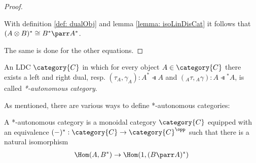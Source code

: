 \documentclass[DIN, pagenumber=false, fontsize=11pt, parskip=half, colorinlistoftodos, svgnames]{scrartcl}
\begin{document}
\begin{proof}
		\begin{center}
		\end{center}
		
		With definition \ref{def: dualObj} and lemma \ref{lemma: isoLinDisCat} it follows that $(A \otimes B)^* \cong B^* \parr A^* $.
		
		The same is done for the other equations.
	\end{proof}
	
	
	
	\begin{definition}
		\label{def: autoCatSrinivasan}
		An LDC $\category{C} $ in which for every object $A \in \category{C} $ there exists a left and right dual, resp. $(\tau_A, \gamma_A): A^* \dashV A $ and $({_A}\tau, {_A}\gamma): A \dashV {^*A} $, is called \emph{*-autonomous category}.
	\end{definition}
	
	As mentioned, there are various ways to define *-autonomous categories:
	
	\begin{definition}
		\label{def: autoCatBarrC}
		A *-autonomous category is a monoidal category $\category{C} $ equipped with an equivalence $(-)^* : \category{C} \rightarrow \category{C}^\opp $ such that there is a natural isomorphism 
		\begin{align*}
			\Hom(A, B^*) \rightarrow \Hom(1, (B \parr A)^*)
		\end{align*}
	\end{definition}
	
\end{document}
